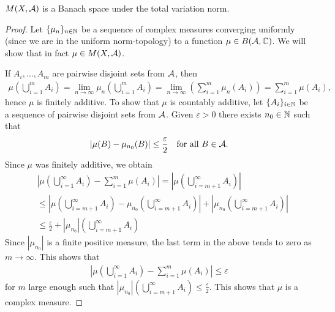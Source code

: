 \documentclass[../../main.tex]{subfiles}
\begin{document}
\begin{theorem}
$M(X, \mathcal{A})$ is a Banach space under the total variation norm.
\end{theorem}
\begin{proof}
Let $\{\mu_{n}\}_{n\in \mathbb{N}}$ be a sequence of complex measures converging uniformly (since we are in the uniform norm-topology) to a function $\mu\in B(\mathcal{A},\mathbb{C})$. We will show that in fact $\mu\in M(X, \mathcal{A})$.

If $A_{i}, \dots, A_{m}$ are pairwise disjoint sets from $\mathcal{A}$, then
\begin{align*}
	\mu\left( \bigcup_{i=1}^{m} A_{i} \right)=\lim_{n\to \infty}\mu_{n}\left( \bigcup_{i=1}^{m} A_{i} \right)=\lim_{n\to \infty} \left( \sum_{i=1}^{m} \mu_{n}(A_{i}) \right)=\sum_{i=1}^{m}\mu(A_{i}),
\end{align*}
hence $\mu$ is finitely additive. To show that $\mu$ is countably additive, let $\{A_{i}\}_{i\in \mathbb{N}}$ be a sequence of pairwise disjoint sets from $\mathcal{A}$. Given $\varepsilon>0$ there exists $n_{0}\in \mathbb{N}$ such that
\begin{align*}
	|\mu(B) - \mu_{n_{0}}(B)| \le \frac{\varepsilon}{2} \quad \text{for all } B\in \mathcal{A}.
\end{align*}
Since $\mu$ was finitely additive, we obtain
\begin{align*}
	&\left| \mu\left( \bigcup_{i=1}^{\infty}A_{i} \right) - \sum_{i=1}^{m}\mu(A_{i}) \right| = \left|\mu\left( \bigcup_{i=m+1}^{\infty}A_{i} \right) \right| \\
	&\le \left| \mu\left( \bigcup_{i=m+1}^{\infty} A_{i} \right) - \mu_{n_{0}}\left( \bigcup_{i=m+1}^{\infty} A_{i} \right) \right| + \left| \mu_{n_{0}}\left( \bigcup_{i=m+1}^{\infty} A_{i} \right) \right| \\
	&\le \frac{\varepsilon}{2} + |\mu_{n_{0}}|\left( \bigcup_{i=m+1}^{\infty} A_{i} \right)
\end{align*}
Since $|\mu_{n_{0}}|$ is a finite positive measure, the last term in the above tends to zero as $m\to \infty$. This shows that
\begin{align*}
	\left| \mu\left( \bigcup_{i=1}^{\infty}A_{i} \right) - \sum_{i=1}^{m}\mu(A_{i}) \right| \le \varepsilon
\end{align*}
for $m$ large enough such that $|\mu_{n_{0}}|\left( \bigcup_{i=m+1}^{\infty} A_{i} \right)\le \frac{\varepsilon}{2}$. This shows that $\mu$ is a complex measure.
\end{proof}
\end{document}
